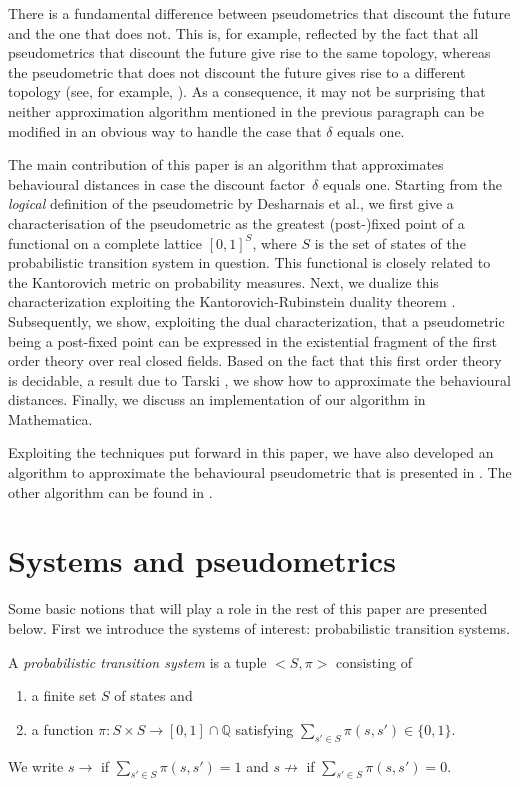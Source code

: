 \documentclass{LMCS}
\begin{document}
There is a fundamental difference between pseudometrics that discount the
future and the one that does not.  This is, for example, reflected by the
fact that all pseudometrics that discount the future give rise to the same
topology, whereas the pseudometric that does not discount the future gives
rise to a different topology (see, for example, \cite[page~350]{DGJP04:tcs}).  
As a consequence,
it may not be surprising that neither approximation algorithm mentioned
in the previous paragraph can be modified in an obvious way to handle the
case that $\delta$ equals one.

The main contribution of this paper is an algorithm that approximates 
behavioural distances in case the discount factor~$\delta$ equals one. 
Starting from the \emph{logical} definition of the pseudometric by 
Desharnais et al., we first give a characterisation of the pseudometric 
as the greatest (post-)fixed point of a functional on a complete lattice 
$[0,1]^S$, where $S$ is the set of states of the probabilistic 
transition system in question.  This functional is closely related to the 
Kantorovich metric \cite{K42:dan} on probability measures.  Next, we dualize 
this characterization exploiting the Kantorovich-Rubinstein
duality theorem \cite{KR58:vestni}.  Subsequently, we show, exploiting
the dual characterization, that a pseudometric being a post-fixed
point can be expressed in the existential fragment of the first order
theory over real closed fields.  Based on the fact that this
first order theory is decidable, a result due to Tarski \cite{T51},
we show how to approximate the behavioural distances. 
Finally, we discuss an implementation of our algorithm in
Mathematica.

Exploiting the techniques put forward in this paper, we have also
developed an algorithm to approximate the behavioural pseudometric that
is presented in \cite{B05:concur}.  The other algorithm 
can be found in \cite{S06:york}.

\section{Systems and pseudometrics}

Some basic notions that will play a role in the rest of this paper are
presented below.  First we introduce the systems of interest:
probabilistic transition systems.

\begin{defi}
A {\sl probabilistic transition system\/} is a tuple $<S, \pi>$ 
consisting of
\begin{enumerate}[$\bullet$]
\item
a finite set $S$ of states and
\item
a function $\pi : S \times S \to [0, 1] \cap \mathbb{Q}$ satisfying
$\sum_{s' \in S} \pi(s, s') \in \{ 0, 1 \}$.
\end{enumerate}
We write $s \rightarrow$ if $\sum_{s' \in S} \pi(s, s') = 1$ and
$s \not\rightarrow$ if $\sum_{s' \in S} \pi(s, s') = 0$.
\end{defi}
\end{document}
